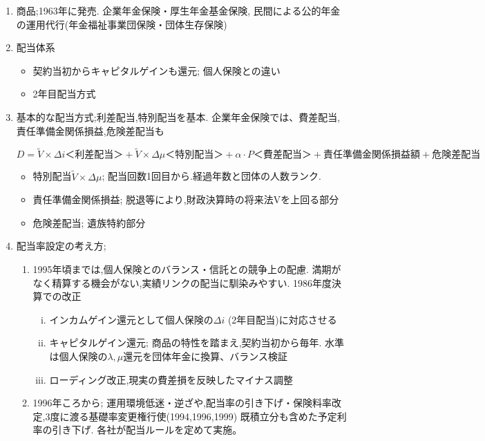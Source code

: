 \documentclass[report,gutter=10mm,fore-edge=10mm,uplatex,dvipdfmx]{jlreq}
\begin{document}
\begin{enumerate}
 \item 商品;1963年に発売. 企業年金保険・厚生年金基金保険, 民間による公的年金の運用代行(年金福祉事業団保険・団体生存保険)
 \item 配当体系
\begin{itemize}
 \item 契約当初からキャピタルゲインも還元; 個人保険との違い
 \item 2年目配当方式
\end{itemize}
 \item 基本的な配当方式;利差配当,特別配当を基本.  企業年金保険では、費差配当,責任準備金関係損益,危険差配当も

$$ D = \tilde{V} \times \Delta i \text{＜利差配当＞}+ \tilde{V} \times \Delta \mu \text{＜特別配当＞}+ \alpha \cdot P \text{＜費差配当＞}+ \text{責任準備金関係損益額} + \text{危険差配当}
$$
\begin{itemize}
 \item 特別配当$\tilde{V}\times\Delta\mu$; 配当回数1回目から.経過年数と団体の人数ランク.
 \item 責任準備金関係損益; 脱退等により,財政決算時の将来法Vを上回る部分
 \item 危険差配当; 遺族特約部分
\end{itemize}
 \item 配当率設定の考え方;  
\begin{enumerate}
 \item 1995年頃までは,個人保険とのバランス・信託との競争上の配慮.   満期がなく精算する機会がない,実績リンクの配当に馴染みやすい.  1986年度決算での改正
\begin{enumerate}[(i)]
 \item インカムゲイン還元として個人保険の$\Delta i$ (2年目配当)に対応させる
 \item キャピタルゲイン還元; 商品の特性を踏まえ,契約当初から毎年. 水準は個人保険の$\lambda, \mu$還元を団体年金に換算、バランス検証
 \item ローディング改正,現実の費差損を反映したマイナス調整
\end{enumerate}
 \item 1996年ころから; 運用環境低迷・逆ざや,配当率の引き下げ・保険料率改定,3度に渡る基礎率変更権行使(1994,1996,1999) 既積立分も含めた予定利率の引き下げ. 各社が配当ルールを定めて実施。
\end{enumerate}
\end{enumerate}
\end{document}
